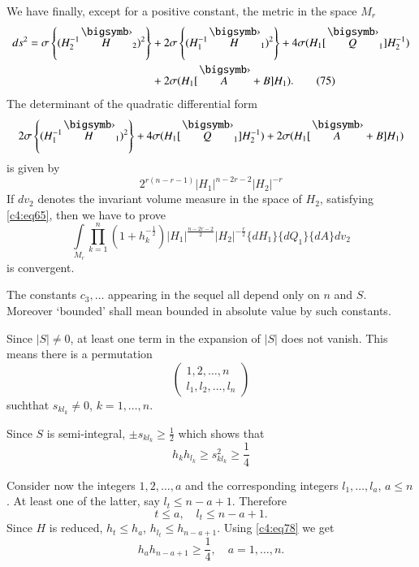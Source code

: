 We have finally, except for a positive constant, the metric in the
space $M_{r}$
\begin{align*}
ds^{2}=\sigma\left\{(H^{-1}_{2}\overdot{H}_{2})^{2}\right\} &+
2\sigma\left\{(H^{-1}_{1}\overdot{H}_{1})^{2}\right\}+4\sigma
(H_{1}[\overdot{Q}_{1}]H^{-1}_{2})\\
&+2\sigma(H_{1}[\overdot{A}+B]H_{1}).\tag{75}\label{c4:eq75}
\end{align*}
The determinant of the quadratic differential form
$$
2\sigma\left\{(H^{-1}_{1}\overdot{H}_{1})^{2}\right\}+4\sigma(H_{1}[\overdot{Q}_{1}]H^{-1}_{2})+2\sigma(H_{1}[\overdot{A}+B]H_{1}) 
$$
is given by
\begin{equation*}
2^{r(n-r-1)}|H_{1}|^{n-2r-2}|H_{2}|^{-r}\tag{76}\label{c4:eq76}
\end{equation*}
If $dv_{2}$ denotes the invariant volume measure in the space of
$H_{2}$, satisfying \eqref{c4:eq65}, then we have to prove
\begin{equation*}
\int\limits_{M_{r}}\prod^{n}_{k=1}(1+h^{-\frac{1}{2}}_{k})|H_{1}|^{\frac{n-2r-2}{2}}|H_{2}|^{-\frac{r}{2}}\{dH_{1}\}\{dQ_{1}\}\{dA\}dv_{2}\tag{77}\label{c4:eq77} 
\end{equation*}
is convergent.

The constants $c_{3},\ldots$ appearing in the sequel all depend only
on $n$ and $S$. Moreover `bounded' shall mean bounded in absolute
value by such constants.

Since $|S|\neq 0$, at least one term in the expansion of $|S|$ does
not vanish. This means there is a permutation
$$
\begin{pmatrix}
1,2,\ldots,n\\
l_{1},l_{2},\ldots,l_{n}
\end{pmatrix}
$$
such\pageoriginale that $s_{kl_{k}}\neq 0$, $k=1,\ldots,n$.

Since $S$ is semi-integral, $\pm s_{kl_{k}}\geq \frac{1}{2}$ which
shows that
\begin{equation*}
h_{k}h_{l_{k}}\geq s^{2}_{kl_{k}}\geq \frac{1}{4}\tag{78}\label{c4:eq78}
\end{equation*}

Consider now the integers $1,2,\ldots,a$ and the corresponding
integers $l_{1},\ldots,l_{a}$, $a\leq n$. At least one of the latter,
say $l_{t}\leq n-a+1$. Therefore 
$$
t\leq a,\quad l_{t}\leq n-a+1.
$$
Since $H$ is reduced, $h_{t}\leq h_{a}$, $h_{l_{t}}\leq
h_{n-a+1}$. Using \eqref{c4:eq78} we get
\begin{equation*}
h_{a}h_{n-a+1}\geq \frac{1}{4},\quad a=1,\ldots,n.\tag{79}\label{c4:eq79}
\end{equation*}

